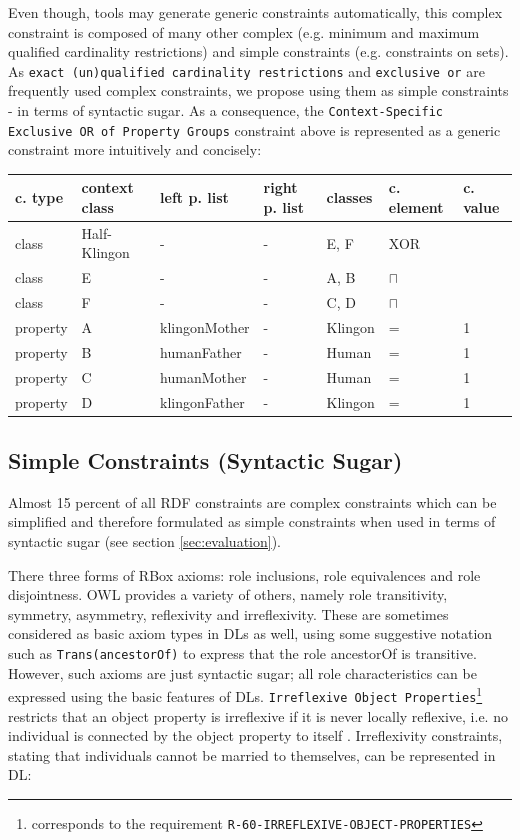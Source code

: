 \documentclass{llncs}
\newcommand{\ms}[1]{\texttt{#1}}
\newenvironment{gcotable}{
  \scriptsize
  \sffamily
  \vspace{0.3cm}
	\begin{center}
  \begin{tabular}{l|l|l|l|l|l|l}
  \hline
  \textbf{c. type} & \textbf{context class} & \textbf{left p. list} & \textbf{right p. list} & \textbf{classes} & \textbf{c. element} & \textbf{c. value} \\
  \hline

}{
  \hline
  \end{tabular}
	\end{center}
}
\begin{document}
Even though, tools may generate generic constraints automatically, this complex constraint is composed of many other complex (e.g. minimum and maximum qualified cardinality restrictions) and simple constraints (e.g. constraints on sets).
As \ms{exact (un)qualified cardinality restrictions} and \ms{exclusive or} are frequently used complex constraints,
we propose using them as simple constraints - 	in terms of syntactic sugar.
As a consequence, the \ms{Context-Specific Exclusive OR of Property Groups} constraint above is represented as a generic constraint more intuitively and concisely:

\begin{gcotable}
class & Half-Klingon & - & - & E, F & XOR \\
class & E & - & - & A, B & $\sqcap$ \\
class & F & - & - & C, D & $\sqcap$ \\
property & A & klingonMother & - & Klingon & = & 1 \\
property & B & humanFather & - & Human & = & 1 \\
property & C & humanMother & - & Human & = & 1 \\
property & D & klingonFather & - & Klingon & = & 1 \\
\end{gcotable}

\subsection{Simple Constraints (Syntactic Sugar)}

Almost 15 percent of all RDF constraints are complex constraints which can be simplified and therefore formulated as simple constraints when used in terms of syntactic sugar (see section \ref{sec:evaluation}).

There three forms of RBox axioms: role inclusions, role equivalences and role disjointness. 
OWL provides a variety of others, namely role transitivity, symmetry, asymmetry, reflexivity and irreflexivity. 
These are sometimes considered as basic axiom types in DLs as well, using some suggestive notation such as
\ms{Trans(ancestorOf)} to express that the role ancestorOf is transitive. 
However, such axioms are just syntactic sugar; 
all role characteristics can be expressed using the basic features of DLs.
\ms{Irreflexive Object Properties}\footnote{corresponds to the requirement \ms{R-60-IRREFLEXIVE-OBJECT-PROPERTIES}}
restricts that an object property is irreflexive if it is never locally reflexive, i.e. no individual is connected by the object property to itself \cite{Kroetzsch2012}.
Irreflexivity constraints, stating that individuals cannot be married to themselves, can be represented in DL:
\end{document}
